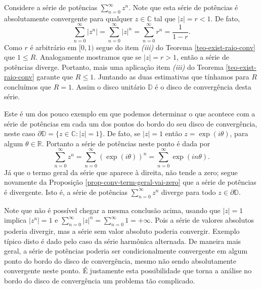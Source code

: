 \begin{exemplo}\label{exemplo-divergencia-bordo-disc-conv}
Considere a série de potências $\sum_{n=0}^{\infty}z^n$. 
Note que esta série de potências é absolutamente convergente 
para qualquer $z\in\mathbb{C}$
tal que $|z|=r<1$. De fato,
\[
\sum_{n=0}^{\infty}|z^n| 
= 
\sum_{n=0}^{\infty}|z|^n 
=
\sum_{n=0}^{\infty}r^n
=
\frac{1}{1-r}. 
\]
Como $r$ é arbitrário em $[0,1)$ segue do item \textit{(iii)} do Teorema \ref{teo-exist-raio-conv} que $1\leqslant R$. Analogamente mostramos
que se $|z|=r>1$, então a série de potências diverge. Portanto,
mais uma aplicação item \textit{(iii)} do Teorema \ref{teo-exist-raio-conv}
garante que $R\leqslant 1$. Juntando as duas estimativas que tínhamos para $R$
concluímos que $R=1$. Assim o disco unitário $\mathbb{D}$ é o disco de
convergência desta série.

Este é um dos pouco exemplo em que podemos 
determinar o que acontece com a 
série de potências em cada um dos pontos do 
bordo do seu disco de convergência, 
neste caso $\partial \mathbb{D} = \{z\in\mathbb{C}: |z|=1\}$.
De fato, se $|z|=1$ então $z=\exp(i\theta)$, para algum $\theta\in\mathbb{R}$.
Portanto a série de potências neste ponto é dada por 
\[
\sum_{n=0}^{\infty} z^n
=
\sum_{n=0}^{\infty} (\exp(i\theta))^n
=
\sum_{n=0}^{\infty} \exp(in\theta).
\]
Já que o termo geral da série que aparece à direita, não tende a zero;
segue novamente da Proposição \ref{prop-conv-term-geral-vai-zero} que 
a série de potências é divergente. Isto é, a série de potências 
$\sum_{n=0}^{\infty}z^n$ diverge para todo $z\in\partial \mathbb{D}$.

Note que não é possível chegar a mesma conclusão acima,
usando que $|z|=1$ implica $|z^n|=1$ e 
$\sum_{n=0}^{\infty} |z|^n = \sum_{n=0}^{\infty} 1 = +\infty$.
Pois a série de valores absolutos poderia divergir, mas a série
sem valor absoluto poderia convergir. Exemplo típico disto é dado 
pelo caso da série harmônica alternada. De maneira mais geral,
a série de potências poderia ser condicionalmente convergente 
em algum ponto do bordo do disco de convergência, mesmo não 
sendo absolutamente convergente neste ponto.  
É justamente esta possibilidade que torna a análise no bordo 
do disco de convergência um problema tão complicado. 
\end{exemplo}



